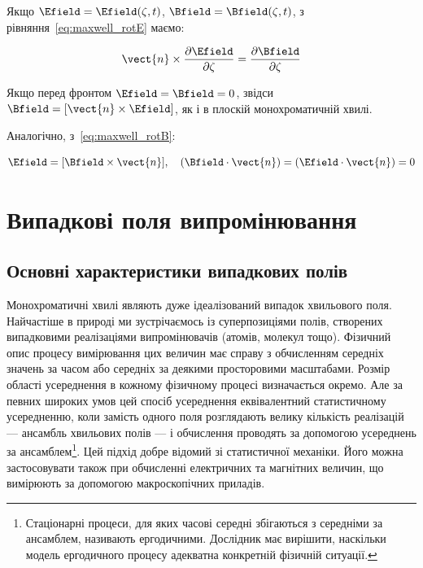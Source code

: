 Якщо \(\Efield = \Efield(\zeta, t)\), \(\Bfield = \Bfield(\zeta, t)\), з рівняння~\eqref{eq:maxwell_rotE} маємо:

\begin{equation*}
	\vect{n} \times \frac{\partial \Efield}{\partial \zeta} = \frac{\partial \Bfield}{\partial \zeta}
\end{equation*}

Якщо перед фронтом \(\Efield = \Bfield = 0\), звідси \(\Bfield = [\vect{n} \times \Efield]\), як і в плоскій
монохроматичній хвилі.

Аналогічно, з~\eqref{eq:maxwell_rotB}:

\begin{equation*}
	\Efield = [\Bfield \times \vect{n}], \quad (\Bfield \cdot \vect{n}) = (\Efield \cdot \vect{n}) = 0
\end{equation*}

\section{Випадкові поля випромінювання}

\subsection*{Основні характеристики випадкових полів}

Монохроматичні хвилі являють дуже ідеалізований випадок хвильового поля. Найчастіше в природі ми зустрічаємось із
суперпозиціями полів, створених випадковими реалізаціями випромінювачів (атомів, молекул тощо). Фізичний опис процесу
вимірювання цих величин має справу з обчисленням середніх значень за часом або середніх за деякими просторовими
масштабами. Розмір області усереднення в кожному фізичному процесі визначається окремо. Але за певних широких умов цей
спосіб усереднення еквівалентний статистичному усередненню, коли замість одного поля розглядають велику кількість
реалізацій --- ансамбль хвильових полів --- і обчислення проводять за допомогою усереднень за
ансамблем\footnote{Стаціонарні процеси, для яких часові середні збігаються з середніми за ансамблем, називають
ергодичними. Дослідник має вирішити, наскільки модель ергодичного процесу адекватна конкретній фізичній ситуації.}. Цей
підхід добре відомий зі статистичної механіки. Його можна застосовувати також при обчисленні електричних та магнітних
величин, що вимірюють за допомогою макроскопічних приладів.

